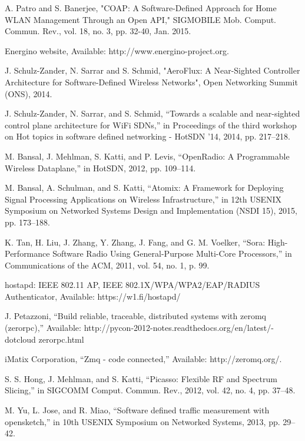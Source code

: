 \begin{thebibliography}{1}
 A. Patro and S. Banerjee, "COAP: A Software-Defined Approach for Home WLAN Management Through an Open API," SIGMOBILE Mob. Comput. Commun. Rev., vol. 18, no. 3, pp. 32-40, Jan. 2015.

 Energino website, Available: http://www.energino-project.org.

 J. Schulz-Zander, N. Sarrar and S. Schmid, "AeroFlux: A Near-Sighted Controller Architecture for Software-Defined Wireless Networks", Open Networking Summit (ONS), 2014.  

 J. Schulz-Zander, N. Sarrar, and S. Schmid, “Towards a scalable and near-sighted control plane architecture for WiFi SDNs,” in Proceedings of the third workshop on Hot topics in software defined networking - HotSDN ’14, 2014, pp. 217–218.



 M. Bansal, J. Mehlman, S. Katti, and P. Levis, “OpenRadio: A Programmable Wireless Dataplane,” in HotSDN, 2012, pp. 109–114.

 M. Bansal, A. Schulman, and S. Katti, “Atomix: A Framework for Deploying Signal Processing Applications on Wireless Infrastructure,” in 12th USENIX Symposium on Networked Systems Design and Implementation (NSDI 15), 2015, pp. 173–188.

 K. Tan, H. Liu, J. Zhang, Y. Zhang, J. Fang, and G. M. Voelker, “Sora: High-Performance Software Radio Using General-Purpose Multi-Core Processors,” in Communications of the ACM, 2011, vol. 54, no. 1, p. 99.


 hostapd: IEEE 802.11 AP, IEEE 802.1X/WPA/WPA2/EAP/RADIUS Authenticator, Available: https://w1.fi/hostapd/

 J. Petazzoni, “Build reliable, traceable, distributed systems with zeromq (zerorpc),” Available: http://pycon-2012-notes.readthedocs.org/en/latest/- dotcloud zerorpc.html

 iMatix Corporation, “Zmq - code connected,” Available: http://zeromq.org/.


 S. S. Hong, J. Mehlman, and S. Katti, “Picasso: Flexible RF and Spectrum Slicing,” in SIGCOMM Comput. Commun. Rev., 2012, vol. 42, no. 4, pp. 37–48.

 M. Yu, L. Jose, and R. Miao, “Software defined traffic measurement with opensketch,” in 10th USENIX Symposium on Networked Systems, 2013, pp. 29–42.


\end{thebibliography}
